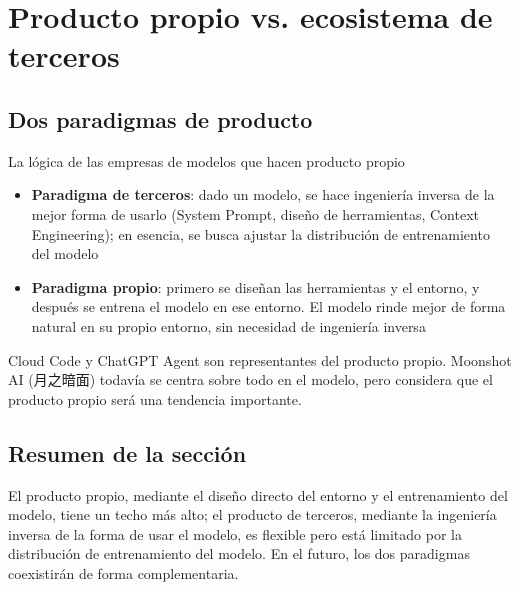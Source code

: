 \section{Producto propio vs. ecosistema de terceros}

\subsection{Dos paradigmas de producto}

\begin{importantbox}{La lógica de las empresas de modelos que hacen producto propio}
\begin{itemize}
    \item \textbf{Paradigma de terceros}: dado un modelo, se hace ingeniería inversa de la mejor forma de usarlo (System Prompt, diseño de herramientas, Context Engineering); en esencia, se busca ajustar la distribución de entrenamiento del modelo
    \item \textbf{Paradigma propio}: primero se diseñan las herramientas y el entorno, y después se entrena el modelo en ese entorno. El modelo rinde mejor de forma natural en su propio entorno, sin necesidad de ingeniería inversa
\end{itemize}
Cloud Code y ChatGPT Agent son representantes del producto propio. Moonshot AI (月之暗面) todavía se centra sobre todo en el modelo, pero considera que el producto propio será una tendencia importante.
\end{importantbox}

\subsection{Resumen de la sección}

El producto propio, mediante el diseño directo del entorno y el entrenamiento del modelo, tiene un techo más alto; el producto de terceros, mediante la ingeniería inversa de la forma de usar el modelo, es flexible pero está limitado por la distribución de entrenamiento del modelo. En el futuro, los dos paradigmas coexistirán de forma complementaria.

